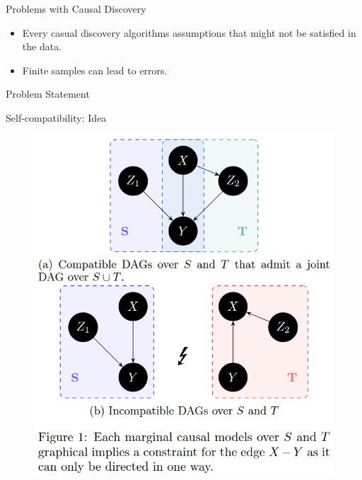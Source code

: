 \documentclass{beamer}
\begin{document}
\begin{frame}{Problems with Causal Discovery}
	\begin{itemize}
		\item Every casual discovery algorithms assumptions that might not be satisfied in the data.
		\item Finite samples can lead to errors.
	\end{itemize}
\end{frame}

\begin{frame}{Problem Statement}
\end{frame}

\begin{frame}{Self-compatibility: Idea}
	\begin{figure}
		\centering
		\includegraphics[scale=0.3]{imgs/example.png}
	\end{figure}
\end{frame}
\end{document}
